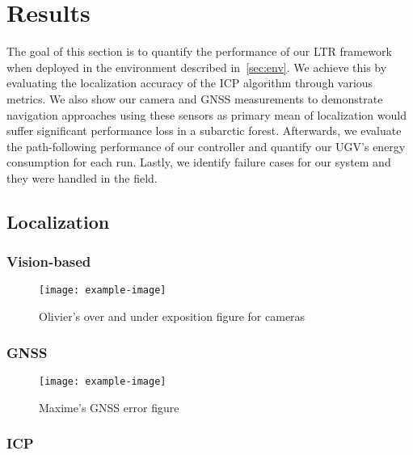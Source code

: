 \section{Results}
\label{sec:results}

The goal of this section is to quantify the performance of our \ac{LTR} framework when deployed in the environment described in~\autoref{sec:env}.
We achieve this by evaluating the localization accuracy of the \ac{ICP} algorithm through various metrics.
We also show our camera and \ac{GNSS} measurements to demonstrate navigation approaches using these sensors as primary mean of localization would suffer significant performance loss in a subarctic forest.
Afterwards, we evaluate the path-following performance of our controller and quantify our \ac{UGV}'s energy consumption for each run.
Lastly, we identify failure cases for our system and they were handled in the field.

\subsection{Localization}
\label{sec:res_loc}

\lightlipsum[1]

\subsubsection{Vision-based}
\label{sec:res_vis}

\lightlipsum[1]

\begin{figure} [htpb]
	\centering
	\texttt{[image: example-image]}
	\caption{Olivier's over and under exposition figure for cameras}
	\label{fig:cameras_expo}
\end{figure}

\subsubsection{GNSS}
\label{sec:res_gnss}

\lightlipsum[1]

\begin{figure} [htpb]
	\centering
	\texttt{[image: example-image]}
	\caption{Maxime's GNSS error figure}
	\label{fig:gnss_error}
\end{figure}

\subsubsection{ICP}
\label{sec:ICP}

